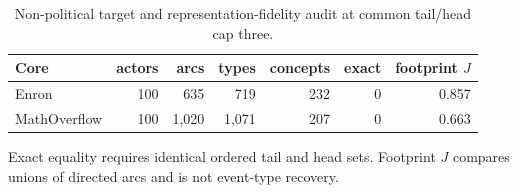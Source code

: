 \begin{table}[tbp]
\centering
\small
\caption{Non-political target and representation-fidelity audit at common tail/head cap three.}
\label{tab:scope-fidelity}
\begin{tabular}{lrrrrrr}
\toprule
Core & actors & arcs & types & concepts & exact & footprint $J$ \\
\midrule
Enron & 100 & 635 & 719 & 232 & 0 & 0.857 \\
MathOverflow & 100 & 1,020 & 1,071 & 207 & 0 & 0.663 \\
\bottomrule
\end{tabular}
\par\vspace{2pt}\footnotesize Exact equality requires identical ordered tail and head sets. Footprint $J$ compares unions of directed arcs and is not event-type recovery.
\end{table}
